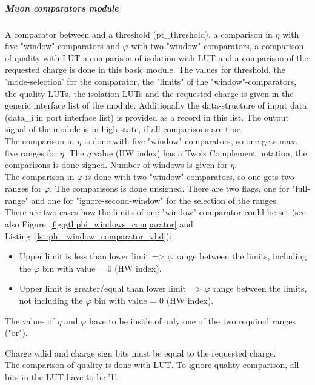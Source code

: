 \subparagraph{Muon comparators module}\label{sec:gtl:muon_comp_module}
A comparator between \pt and a threshold (pt\_threshold), a comparison in $\eta$ with five "window"-comparators and $\varphi$ with two "window"-comparators, a comparison of quality with LUT
a comparison of isolation with LUT and a comparison of the requested charge is done in this basic module. The values for \pt threshold, the 'mode-selection' for the \pt comparator,
the "limits" of the "window"-comparators, the quality LUTs, the isolation LUTs and the requested charge is given in the generic interface list of the module.
Additionally the data-structure of input data (data\_i in port interface list) is provided as a record in this list. The output signal of the module is in high state, if all comparisons are true.\\
The comparison in $\eta$ is done with five "window"-comparators, so one gets max. five ranges for $\eta$. The $\eta$ value (HW index) has a Two's Complement notation, the comparisons is done signed. Number of windows is given for $\eta$.\\
The comparison in $\varphi$ is done with two "window"-comparators, so one gets two ranges for $\varphi$. The comparisons is done unsigned. There are two flags, one for "full-range" and one for "ignore-second-window" for the selection of the ranges.\\
There are two cases how the limits of one "window"-comparator could be set (see also Figure~\ref{fig:gtl:phi_windows_comparator} and Listing~\ref{lst:phi_window_comparator_vhd}):
\begin{itemize}
\item Upper limit is less than lower limit => $\varphi$ range between the limits, including the $\varphi$ bin with value = 0 (HW index).
\item Upper limit is greater/equal than lower limit => $\varphi$ range between the limits, not including the $\varphi$ bin with value = 0 (HW index).
\end{itemize}

The values of $\eta$ and $\varphi$ have to be inside of only one of the two required ranges ("or").

Charge valid and charge sign bits must be equal to the requested charge.\\
The comparison of quality is done with LUT. To ignore quality comparison, all bits in the LUT have to be '1'.\\

